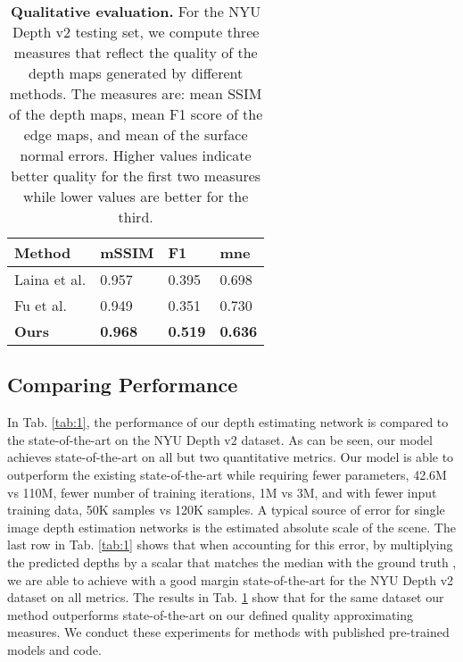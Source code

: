 \documentclass[10pt,twocolumn,letterpaper]{article}
\begin{document}
\begin{table}[t]
\centering
\begin{tabular}{l|lll}
\toprule
Method         & mSSIM & F1 & mne  \\ 
\midrule
Laina et al. \cite{Laina2016}    & 0.957     &  0.395  & 0.698  \\
Fu et al. \cite{Fu2018DeepOR}    & 0.949      &  0.351  & 0.730  \\
\textbf{Ours}                    & \textbf{0.968}  & \textbf{0.519} & \textbf{0.636} \\
\bottomrule
\end{tabular}
\bigskip
\caption{\textbf{Qualitative evaluation.} For the NYU Depth v2 testing set, we compute three measures that reflect the quality of the depth maps generated by different methods. The measures are: mean SSIM of the depth maps, mean F1 score of the edge maps, and mean of the surface normal errors. Higher values indicate better quality for the first two measures while lower values are better for the third. }
\label{tab:2}
\end{table}


\subsection{Comparing Performance}


In Tab. \ref{tab:1}, the performance of our depth estimating network is compared to the state-of-the-art on the NYU Depth v2 dataset. As can be seen, our model achieves state-of-the-art on all but two quantitative metrics. Our model is able to outperform the existing state-of-the-art \cite{Fu2018DeepOR} while requiring fewer parameters, 42.6M vs 110M, fewer number of training iterations, 1M vs 3M, and with fewer input training data, 50K samples vs 120K samples. A typical source of error for single image depth estimation networks is the estimated absolute scale of the scene. The last row in Tab. \ref{tab:1} shows that when accounting for this error, by multiplying the predicted depths by a scalar that matches the median with the ground truth \cite{Zhou2017}, we are able to achieve with a good margin state-of-the-art for the NYU Depth v2 dataset on all metrics. The results in Tab. \ref{tab:2} show that for the same dataset our method outperforms state-of-the-art on our defined quality approximating measures. We conduct these experiments for methods with published pre-trained models and code.
\end{document}
